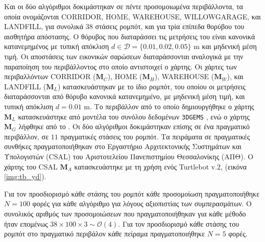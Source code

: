 Και οι δύο αλγόριθμοι δοκιμάστηκαν σε πέντε προσομοιωμένα περιβάλλοντα, τα οποία
ονομάζονται CORRIDOR, HOME, WAREHOUSE, WILLOWGARAGE, και LANDFILL, για συνολικά
$38$ στάσεις ρομπότ, και για τρία επίπεδα θορύβου του αισθητήρα απόστασης. Ο
θόρυβος που διαταράσσει τις μετρήσεις του είναι κανονικά κατανεμημένος με
τυπική απόκλιση $d \in \mathcal{D} = \{0.01, 0.02, 0.05\}$ m και μηδενική μέση
τιμή. Οι αποστάσεις των εικονικών σαρώσεων διαταράσσονται αναλογικά με την
παραποίηση του περιβάλλοντος στο οποίο αντιστοιχεί ο χάρτης. Οι χάρτες των
περιβαλλόντων CORRIDOR ($\bm{M}_C$), HOME ($\bm{M}_H$), WAREHOUSE ($\bm{M}_W$),
και LANDFILL ($\bm{M}_L$) κατασκευάστηκαν με το ίδιο ρομπότ, του οποίου οι
μετρήσεις διαταράσσονται από θόρυβο κανονικά κατανεμημένο, με μηδενική μέση
τιμή, και τυπική απόκλιση $d = 0.01$ m. Το περιβάλλον από το οποίο
δημιουργήθηκε ο χάρτης $\bm{M}_L$ κατασκευάστηκε από μοντέλα του συνόλου
δεδομένων \texttt{3DGEMS} \cite{Rasouli2017}, ενώ ο χάρτης $\bm{M}_G$ λήφθηκε από
το \cite{willow_map}.  Οι δύο αλγόριθμοι δοκιμάστηκαν επίσης σε ένα πραγματικό
περιβάλλον, σε $11$ πραγματικές στάσεις του ρομπότ. Τα πειράματα σε πραγματικές
συνθήκες πραγματοποιήθηκαν στο Εργαστήριο Αρχιτεκτονικής Συστημάτων και
Υπολογιστών (CSAL) του Αριστοτελείου Πανεπιστημίου Θεσσαλονίκης (ΑΠΘ). Ο
χάρτης του CSAL $\bm{M}_A$ κατασκευάστηκε με τη χρήση ενός Turtlebot v.$2$,
(εικόνα \ref{img:tb_yd}).

Για τον προσδιορισμό κάθε στάσης του ρομπότ κάθε προσομοίωση πραγματοποιήθηκε
$N = 100$ φορές για κάθε αλγόριθμο για λόγους αξιοπιστίας των συμπερασμάτων.  Ο
συνολικός αριθμός των προσομοιώσεων που πραγματοποιήθηκαν για κάθε μέθοδο ήταν
επομένως $ 38 \times 100 \times 3 \sim \mathcal{O}(4)$.  Για τον προσδιορισμό
κάθε στάσης του ρομπότ στο πραγματικό περιβάλον κάθε πείραμα πραγματοποιήθηκε
$N = 5$ φορές.

